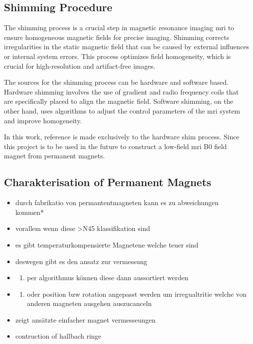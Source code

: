 \hypertarget{shimming-procedure}{%
\subsection{Shimming Procedure}\label{shimming-procedure}}

The shimming process is a crucial step in magnetic resonance imaging
\gls{mri} to ensure homogeneous magnetic fields for precise imaging.
Shimming corrects irregularities in the static magnetic field that can
be caused by external influences or internal system errors. This process
optimizes field homogeneity, which is crucial for high-resolution and
artifact-free images.\cite{10.3389/fphy.2021.704566}

The sources for the shimming process can be hardware and software based.
Hardware shimming involves the use of gradient and radio frequency coils
that are specifically placed to align the magnetic field. Software
shimming, on the other hand, uses algorithms to adjust the control
parameters of the \gls{mri} system and improve
homogeneity.\cite{10.3389/fphy.2021.704566}

In this work, reference is made exclusively to the hardware shim
process. Since this project is to be used in the future to construct a
low-field \gls{mri} B0 field magnet from permanent magnets.

\hypertarget{charakterisation-of-permanent-magnets}{%
\subsection{Charakterisation of Permanent
Magnets}\label{charakterisation-of-permanent-magnets}}

\begin{itemize}
\item
  durch fabrikatio von permantentmagneten kann es zu abweichungen
  kommen*
\item
  vorallem wenn diese \textgreater N45 klassifikation sind
\item
  es gibt temperaturkompensierte Magnetene welche teuer sind
\item
  deswegen gibt es den ansatz zur vermessung
\item
  \begin{enumerate}
  \def\labelenumi{\arabic{enumi}.}
  \tightlist
  \item
    per algorithmus können diese dann aussortiert werden
  \end{enumerate}
\item
  \begin{enumerate}
  \def\labelenumi{\arabic{enumi}.}
  \setcounter{enumi}{1}
  \tightlist
  \item
    oder position bzw rotation angepasst werden um irregualtritie welche
    von anderen magneten ausgehen auszucanceln
  \end{enumerate}
\item
  zeigt ansätzte einfacher magnet vermesseungen
  \cite{Wickenbrock_2021}
\item
  contruction of hallbach ringe \cite{cmr.a.20165}
\end{itemize}

